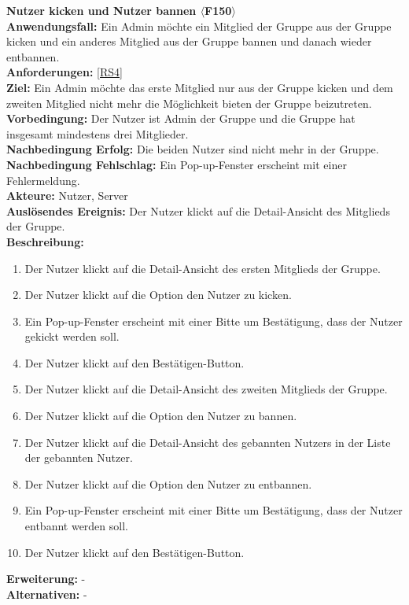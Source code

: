 \documentclass[parskip=full]{scrartcl}
\begin{document}
\textbf{Nutzer kicken und Nutzer bannen $\langle$F150$\rangle$}\\
\textbf{Anwendungsfall:} Ein Admin möchte ein Mitglied der Gruppe aus der Gruppe kicken und ein anderes Mitglied aus der Gruppe bannen und danach wieder entbannen.\\
\textbf{Anforderungen:} \ref{RS4}\\
\textbf{Ziel:} Ein Admin möchte das erste Mitglied nur aus der Gruppe kicken und dem zweiten Mitglied nicht mehr die Möglichkeit bieten der Gruppe beizutreten.\\
\textbf{Vorbedingung:} Der Nutzer ist Admin der Gruppe und die Gruppe hat insgesamt mindestens drei Mitglieder.\\
\textbf{Nachbedingung Erfolg:} Die beiden Nutzer sind nicht mehr in der Gruppe.\\
\textbf{Nachbedingung Fehlschlag:} Ein Pop-up-Fenster erscheint mit einer Fehlermeldung.\\
\textbf{Akteure:} Nutzer, Server \\
\textbf{Auslösendes Ereignis:} Der Nutzer klickt auf die Detail-Ansicht des Mitglieds der Gruppe.\\
\textbf{Beschreibung:}
\begin{enumerate}
    \item Der Nutzer klickt auf die Detail-Ansicht des ersten Mitglieds der Gruppe.
    \item Der Nutzer klickt auf die Option den Nutzer zu kicken.
    \item Ein Pop-up-Fenster erscheint mit einer Bitte um Bestätigung, dass der Nutzer gekickt werden soll.
    \item Der Nutzer klickt auf den Bestätigen-Button.
    \item Der Nutzer klickt auf die Detail-Ansicht des zweiten Mitglieds der Gruppe.
    \item Der Nutzer klickt auf die Option den Nutzer zu bannen.
    \item Der Nutzer klickt auf die Detail-Ansicht des gebannten Nutzers in der Liste der gebannten Nutzer.
    \item Der Nutzer klickt auf die Option den Nutzer zu entbannen.
    \item Ein Pop-up-Fenster erscheint mit einer Bitte um Bestätigung, dass der Nutzer entbannt werden soll.
    \item Der Nutzer klickt auf den Bestätigen-Button.
\end{enumerate}
\textbf{Erweiterung:} -\\
\textbf{Alternativen:} -
\newpage
\end{document}
